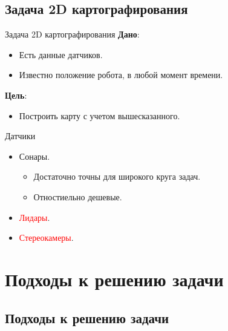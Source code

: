 \documentclass[9pt]{beamer}
\begin{document}
      

\subsection{Задача 2D картографирования}

\begin{frame}{Задача 2D картографирования}
\textbf{Дано}:
\begin{itemize}

  \item
  {
    Есть данные датчиков.
  }
  \item
  {
    Известно положение робота, в любой момент времени.
  }
\end{itemize}
\textbf{Цель}:
\begin{itemize}
  \item
  {
    Построить карту с учетом вышесказанного.
  }
\end{itemize}
\end{frame}

\begin{frame}{Датчики}

\begin{itemize}
  \item
  {
    Сонары.
    \begin{itemize}
    \item
    {
      Достаточно точны для широкого круга задач.
    }
    \item
    {
      Отностиельно дешевые.
    }
    \end{itemize}
  }
  \item
  {
    \textcolor{red}{Лидары}.
  }
  \item
  {
    \textcolor{red}{Стереокамеры}.
  }
\end{itemize}

\end{frame}

\section{Подходы к решению задачи}

\subsection{Подходы к решению задачи}
\end{document}
